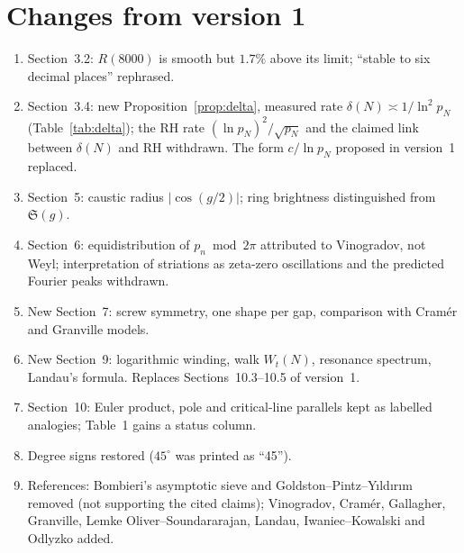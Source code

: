 \documentclass[11pt,a4paper]{article}
\theoremstyle{remark}
\theoremstyle{definition}
\newcommand{\dg}{^\circ}
\begin{document}
\section{Changes from version 1}\label{app:rev}
\begin{enumerate}[nosep]
\item Section~3.2: $R(8000)$ is smooth but $1.7\%$ above its limit; ``stable to six decimal places'' rephrased.
\item Section~3.4: new Proposition~\ref{prop:delta}, measured rate $\delta(N)\asymp1/\ln^2p_N$ (Table~\ref{tab:delta}); the RH rate $(\ln p_N)^2/\sqrt{p_N}$ and the claimed link between $\delta(N)$ and RH withdrawn. The form $c/\ln p_N$ proposed in version~1 replaced.
\item Section~5: caustic radius $|\cos(g/2)|$; ring brightness distinguished from $\mathfrak S(g)$.
\item Section~6: equidistribution of $p_n\bmod2\pi$ attributed to Vinogradov, not Weyl; interpretation of striations as zeta-zero oscillations and the predicted Fourier peaks withdrawn.
\item New Section~7: screw symmetry, one shape per gap, comparison with Cram\'er and Granville models.
\item New Section~9: logarithmic winding, walk $W_t(N)$, resonance spectrum, Landau's formula. Replaces Sections~10.3--10.5 of version~1.
\item Section~10: Euler product, pole and critical-line parallels kept as labelled analogies; Table~1 gains a status column.
\item Degree signs restored ($45\dg$ was printed as ``45'').
\item References: Bombieri's asymptotic sieve and Goldston--Pintz--Y{\i}ld{\i}r{\i}m removed (not supporting the cited claims); Vinogradov, Cram\'er, Gallagher, Granville, Lemke Oliver--Soundararajan, Landau, Iwaniec--Kowalski and Odlyzko added.
\end{enumerate}
\end{document}
